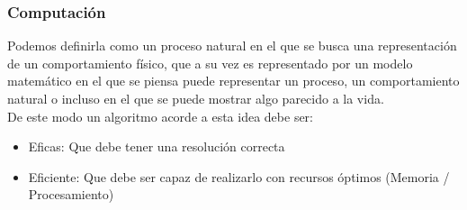 \documentclass[10pt,executivepaper]{article}
\begin{document}
\subsubsection{Computación}
Podemos definirla como un proceso natural en el que se busca una representación de un comportamiento físico, que a su vez es representado por un modelo matemático en el que se piensa puede representar un proceso, un comportamiento natural o incluso en el que se puede mostrar algo parecido a la vida.
\\
De este modo un algoritmo acorde a esta idea debe ser:
\begin{itemize}
	\item Eficas: Que debe tener una resolución correcta
	\item Eficiente: Que debe ser capaz de realizarlo con recursos óptimos (Memoria / Procesamiento)
\end{itemize}

\printindex
\end{document}
